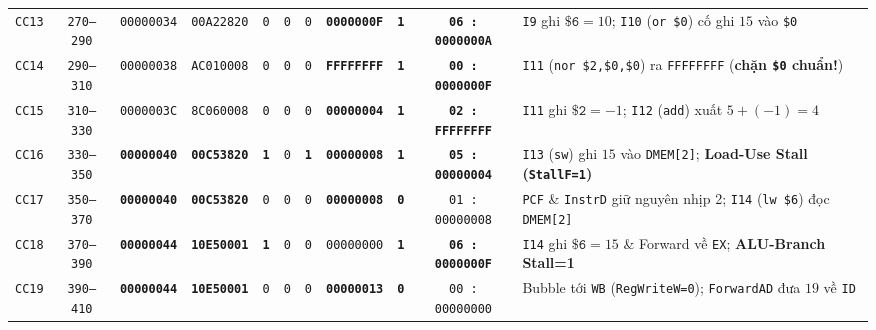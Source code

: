 \documentclass[12pt,a4paper]{report}
\begin{document}
\begin{table}[H]
{{\begin{tabular}{@{}ccccccccccl@{}}
\texttt{CC13} & \texttt{270--290} & \texttt{00000034} & \texttt{00A22820} & \texttt{0} & \texttt{0} & \texttt{0} & \textbf{\texttt{0000000F}} & \textbf{\texttt{1}} & \textbf{\texttt{06 : 0000000A}} & \parbox{11.5cm}{\raggedright \texttt{I9} ghi $\texttt{\$6}=10$; \texttt{I10} (\texttt{or \$0}) cố ghi $15$ vào \texttt{\$0}} \\
\texttt{CC14} & \texttt{290--310} & \texttt{00000038} & \texttt{AC010008} & \texttt{0} & \texttt{0} & \texttt{0} & \textbf{\texttt{FFFFFFFF}} & \textbf{\texttt{1}} & \textbf{\texttt{00 : 0000000F}} & \parbox{11.5cm}{\raggedright \texttt{I11} (\texttt{nor \$2,\$0,\$0}) ra \texttt{FFFFFFFF} (\textbf{chặn \texttt{\$0} chuẩn!})} \\
\texttt{CC15} & \texttt{310--330} & \texttt{0000003C} & \texttt{8C060008} & \texttt{0} & \texttt{0} & \texttt{0} & \textbf{\texttt{00000004}} & \textbf{\texttt{1}} & \textbf{\texttt{02 : FFFFFFFF}} & \parbox{11.5cm}{\raggedright \texttt{I11} ghi $\texttt{\$2}=-1$; \texttt{I12} (\texttt{add}) xuất $5+(-1)=4$} \\ \midrule
\texttt{CC16} & \texttt{330--350} & \textbf{\texttt{00000040}} & \textbf{\texttt{00C53820}} & \textbf{\texttt{1}} & \texttt{0} & \textbf{\texttt{1}} & \textbf{\texttt{00000008}} & \textbf{\texttt{1}} & \textbf{\texttt{05 : 00000004}} & \parbox{11.5cm}{\raggedright \texttt{I13} (\texttt{sw}) ghi $15$ vào \texttt{DMEM[2]}; \textbf{Load-Use Stall (\texttt{StallF=1})}} \\
\texttt{CC17} & \texttt{350--370} & \textbf{\texttt{00000040}} & \textbf{\texttt{00C53820}} & \texttt{0} & \texttt{0} & \texttt{0} & \textbf{\texttt{00000008}} & \textbf{\texttt{0}} & \texttt{01 : 00000008} & \parbox{11.5cm}{\raggedright \texttt{PCF} \& \texttt{InstrD} giữ nguyên nhịp 2; \texttt{I14} (\texttt{lw \$6}) đọc \texttt{DMEM[2]}} \\
\texttt{CC18} & \texttt{370--390} & \textbf{\texttt{00000044}} & \textbf{\texttt{10E50001}} & \textbf{\texttt{1}} & \texttt{0} & \texttt{0} & \texttt{00000000} & \textbf{\texttt{1}} & \textbf{\texttt{06 : 0000000F}} & \parbox{11.5cm}{\raggedright \texttt{I14} ghi $\texttt{\$6}=15$ \& Forward về \texttt{EX}; \textbf{ALU-Branch Stall=1}} \\
\texttt{CC19} & \texttt{390--410} & \textbf{\texttt{00000044}} & \textbf{\texttt{10E50001}} & \texttt{0} & \texttt{0} & \texttt{0} & \textbf{\texttt{00000013}} & \textbf{\texttt{0}} & \texttt{00 : 00000000} & \parbox{11.5cm}{\raggedright Bubble tới \texttt{WB} (\texttt{RegWriteW=0}); \texttt{ForwardAD} đưa $19$ về \texttt{ID}} \\

\end{tabular}}}
\end{table}
\end{document}

